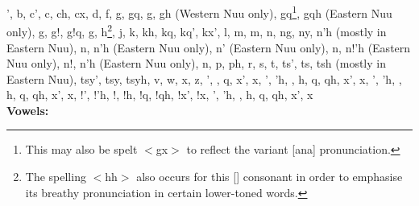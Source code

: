 ', b, c', c, ch, cx, d, f, g, gq, g\textipa{\textvertline},
g\textipa{\textvertline}h (Western N\textipa{\textvertline}uu only),
g\textipa{\textvertline}q\footnote{This may also be spelt
$<$g\textipa{\textvertline}x$>$ to reflect the variant
[ana] pronunciation.},
g\textipa{\textvertline}qh (Eastern N\textipa{\textvertline}uu only),
g\textipa{\textdoublevertline}, g!, g!q,
g\textipa{\textdoublebarpipe}, h\footnote{The spelling $<$hh$>$ also
occurs for this [] consonant in order to emphasise its
breathy pronunciation in certain lower-toned words.}, j, k, kh, kq,
kq', kx', l, m, m, n, ng, ny, n\textipa{\textvertline}'h
(mostly in Eastern N\textipa{\textvertline}uu),
n\textipa{\textvertline}, n\textipa{\textdoublevertline}'h (Eastern
N\textipa{\textvertline}uu only), n\textipa{\textdoublevertline}'
(Eastern N\textipa{\textvertline}uu only),
n\textipa{\textdoublevertline}, n!'h (Eastern
N\textipa{\textvertline}uu only), n!, n\textipa{\textdoublebarpipe}'h
(Eastern N\textipa{\textvertline}uu only),
n\textipa{\textdoublebarpipe}, p, ph, r, s, t, ts', ts, tsh (mostly in
Eastern N\textipa{\textvertline}uu), tsy', tsy, tsyh, v, w, x, z,
', , q, x',
x, \textipa{\textvertline}', \textipa{\textvertline}'h,
\textipa{\textvertline}, \textipa{\textvertline}h,
\textipa{\textvertline}q, \textipa{\textvertline}qh,
\textipa{\textvertline}x', \textipa{\textvertline}x,
\textipa{\textdoublevertline}', \textipa{\textdoublevertline}'h,
\textipa{\textdoublevertline}, \textipa{\textdoublevertline}h,
\textipa{\textdoublevertline}q, \textipa{\textdoublevertline}qh,
\textipa{\textdoublevertline}x', \textipa{\textdoublevertline}x, !',
!'h, !, !h, !q, !qh, !x', !x, \textipa{\textdoublebarpipe}',
\textipa{\textdoublebarpipe}'h, \textipa{\textdoublebarpipe},
\textipa{\textdoublebarpipe}h, \textipa{\textdoublebarpipe}q,
\textipa{\textdoublebarpipe}qh, \textipa{\textdoublebarpipe}x',
\textipa{\textdoublebarpipe}x\\

\textbf{Vowels:}

